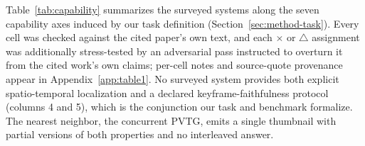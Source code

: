 Table~\ref{tab:capability} summarizes the surveyed systems along the seven capability axes induced by our task definition (Section~\ref{sec:method-task}). Every cell was checked against the cited paper's own text, and each $\times$ or $\triangle$ assignment was additionally stress-tested by an adversarial pass instructed to overturn it from the cited work's own claims; per-cell notes and source-quote provenance appear in Appendix~\ref{app:table1}. No surveyed system provides both explicit spatio-temporal localization and a declared keyframe-faithfulness protocol (columns 4 and 5), which is the conjunction our task and benchmark formalize. The nearest neighbor, the concurrent PVTG, emits a single thumbnail with partial versions of both properties and no interleaved answer.

\begin{table}[t]
\centering
\caption{Capability comparison across the surveyed systems; \checkmark\ provided, $\times$ absent, $\triangle$ partial, with detailed per-cell notes in Appendix~\ref{app:table1}.}
\label{tab:capability}
\end{table}
